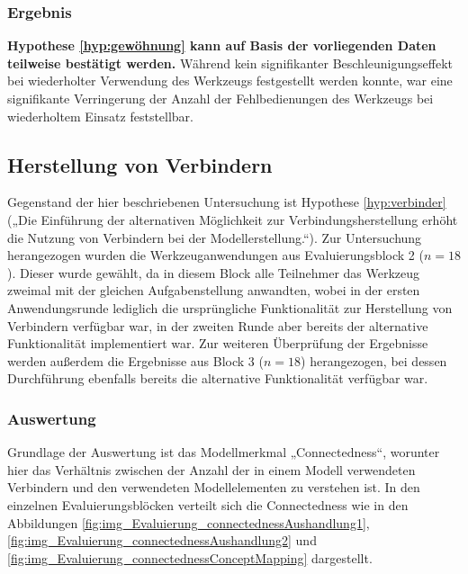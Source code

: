 \subsubsection{Ergebnis} 

\textbf{Hypothese \ref{hyp:gewöhnung} kann auf Basis der vorliegenden Daten teilweise bestätigt werden.} Während kein signifikanter Beschleunigungseffekt bei wiederholter Verwendung des Werkzeugs festgestellt werden konnte, war eine signifikante Verringerung der Anzahl der Fehlbedienungen des Werkzeugs bei wiederholtem Einsatz feststellbar.


\subsection{Herstellung von Verbindern} %
\label{sub:herstellung_von_verbindern}

Gegenstand der hier beschriebenen Untersuchung ist Hypothese \ref{hyp:verbinder} („Die Einführung der alternativen Möglichkeit zur Verbindungsherstellung erhöht die Nutzung von Verbindern bei der Modellerstellung.“). Zur Untersuchung herangezogen wurden die Werkzeuganwendungen aus Evaluierungsblock 2 ($n=18$). Dieser wurde gewählt, da in diesem Block alle Teilnehmer das Werkzeug zweimal mit der gleichen Aufgabenstellung anwandten, wobei in der ersten Anwendungsrunde lediglich die ursprüngliche Funktionalität zur Herstellung von Verbindern verfügbar war, in der zweiten Runde aber bereits der alternative Funktionalität implementiert war. Zur weiteren Überprüfung der Ergebnisse werden außerdem die Ergebnisse aus Block 3 ($n=18$) herangezogen, bei dessen Durchführung ebenfalls bereits die alternative Funktionalität verfügbar war.

\subsubsection{Auswertung} %

Grundlage der Auswertung ist das Modellmerkmal „Connectedness“, worunter hier das Verhältnis zwischen der Anzahl der in einem Modell verwendeten Verbindern und den verwendeten Modellelementen zu verstehen ist. In den einzelnen Evaluierungsblöcken verteilt sich die Connectedness wie in den Abbildungen \ref{fig:img_Evaluierung_connectednessAushandlung1}, \ref{fig:img_Evaluierung_connectednessAushandlung2} und \ref{fig:img_Evaluierung_connectednessConceptMapping} dargestellt.

